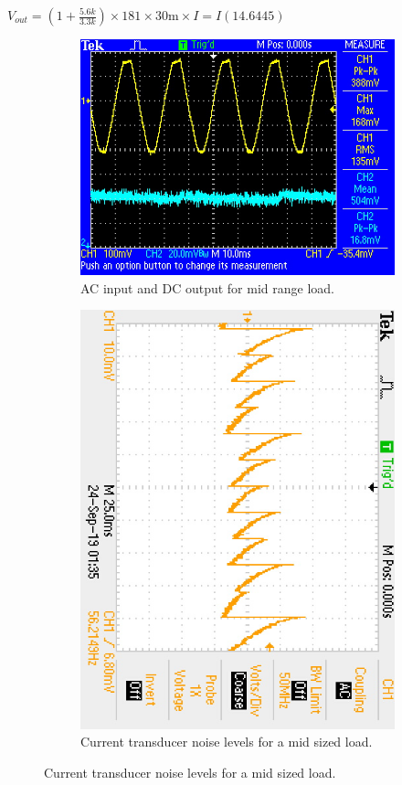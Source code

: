 $V_{out} = (1+\frac{5.6k}{3.3k}) \times 181 \times 30\si{\milli} \times I = I(14.6445)$
\begin{figure}
 \centering
     \begin{subfigure}[]{0.45\textwidth}
        \centering
         \includegraphics[width=1\linewidth]{./Figures/current_measure}
		    \caption{AC input and DC output for mid range load.} \label{subfig:current_measure}
     \end{subfigure}
      \begin{subfigure}[]{0.45\textwidth}
              \centering
  		\includegraphics[height=1\linewidth,angle=90]{./Figures/current_noise_measure}
		    \caption{Current transducer noise levels for a mid sized load.} \label{subfig:current_noise}
     \end{subfigure}
 \end{figure}
 
